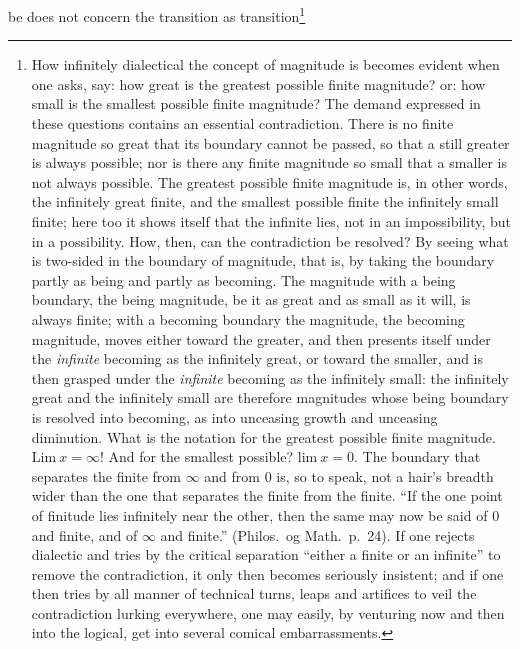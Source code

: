 \documentclass[12pt,a4paper]{book}
\begin{document}
be does not concern the transition as transition\footnote{How infinitely
dialectical the concept of magnitude is becomes evident when one asks, say: how
great is the greatest possible finite magnitude? or: how small is the smallest
possible finite magnitude? The demand expressed in these questions contains an
essential contradiction. There is no finite magnitude so great that its
boundary cannot be passed, so that a still greater is always possible; nor is
there any finite magnitude so small that a smaller is not always possible. The
greatest possible finite magnitude is, in other words, the infinitely great
finite, and the smallest possible finite the infinitely small finite; here too
it shows itself that the infinite lies, not in an impossibility, but in a
possibility. How, then, can the contradiction be resolved? By seeing what is
two-sided in the boundary of magnitude, that is, by taking the boundary partly
as being and partly as becoming. The magnitude with a being boundary, the being
magnitude, be it as great and as small as it will, is always finite; with a
becoming boundary the magnitude, the becoming magnitude, moves either toward
the greater, and then presents itself under the \emph{infinite} becoming as the
infinitely great, or toward the smaller, and is then grasped under the
\emph{infinite} becoming as the
infinitely small: the infinitely great and the infinitely small are therefore
magnitudes whose being boundary is resolved into becoming, as into unceasing
growth and unceasing diminution. What is the notation for the greatest possible
finite magnitude. $\mathrm{Lim}\ x = \infty$! And for the smallest possible?
$\mathrm{lim}\ x = 0$. The boundary that separates the finite from $\infty$ and
from $0$ is, so to speak, not a hair's breadth wider than the one that
separates the finite from the finite. ``If the one point of finitude lies
infinitely near the other, then the same may now be said of $0$ and finite, and
of $\infty$ and finite.'' (Philos.\ og Math.\ p.~24). If one rejects dialectic
and tries by the critical separation ``either a finite or an infinite'' to
remove the contradiction, it only then becomes seriously insistent; and if one
then tries by all manner of technical turns, leaps and artifices to veil the
contradiction lurking everywhere, one may easily, by venturing now and then
into the logical, get into several comical embarrassments.
}
\end{document}
